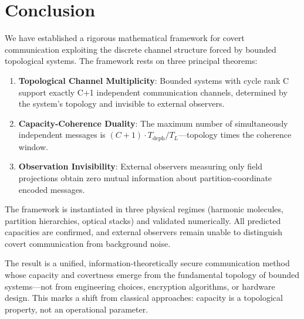 \documentclass[11pt,twocolumn,a4paper]{article}
\theoremstyle{definition}
\begin{document}
\section{Conclusion}
\label{sec:conclusion}

We have established a rigorous mathematical framework for covert communication exploiting the discrete channel structure forced by bounded topological systems. The framework rests on three principal theorems:

\begin{enumerate}[nosep]
\item \textbf{Topological Channel Multiplicity}: Bounded systems with cycle rank C support exactly C+1 independent communication channels, determined by the system's topology and invisible to external observers.

\item \textbf{Capacity-Coherence Duality}: The maximum number of simultaneously independent messages is $(C+1) \cdot T_{\text{deph}}/T_L$—topology times the coherence window.

\item \textbf{Observation Invisibility}: External observers measuring only field projections obtain zero mutual information about partition-coordinate encoded messages.
\end{enumerate}

The framework is instantiated in three physical regimes (harmonic molecules, partition hierarchies, optical stacks) and validated numerically. All predicted capacities are confirmed, and external observers remain unable to distinguish covert communication from background noise.

The result is a unified, information-theoretically secure communication method whose capacity and covertness emerge from the fundamental topology of bounded systems—not from engineering choices, encryption algorithms, or hardware design. This marks a shift from classical approaches: capacity is a topological property, not an operational parameter.
\end{document}
